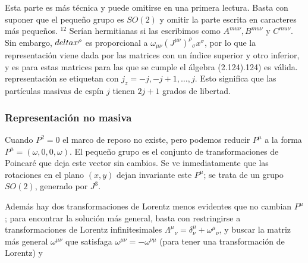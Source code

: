 {Esta parte es más técnica y puede omitirse en una primera lectura. Basta con suponer que el pequeño grupo es $S O(2)$ y omitir la parte escrita en caracteres más pequeños. ${ }^{12}$ Serían hermitianas si las escribimos como $A^{mu \nu}, B^{mu \nu}$ y $C^{mu \nu}$. Sin embargo, $\\delta x^{\rho}$ es proporcional a $\omega_{\mu \nu}\left(J^{\mu \nu}\right)^{\rho}{ }_{\sigma} x^{\sigma}$, por lo que la representación viene dada por las matrices con un índice superior y otro inferior, y es para estas matrices para las que se cumple el álgebra (2.124).124) es válida. representación se etiquetan con $j_{z}=-j,-j+1, \ldots, j$. Esto significa que las partículas masivas de espín $j$ tienen $2 j+1$ grados de libertad.
  \subsubsection{Representación no masiva}
  
  Cuando $P^{2}=0$ el marco de reposo no existe, pero podemos reducir $P^{\mu}$ a la forma $P^{\mu}=(\omega, 0,0, \omega)$. El pequeño grupo es el conjunto de transformaciones de Poincaré que deja este vector sin cambios. Se ve inmediatamente que las rotaciones en el plano $(x, y)$ dejan invariante este $P^{\mu}$; se trata de un grupo $S O(2)$, generado por $J^{3}$.

  Además hay dos transformaciones de Lorentz menos evidentes que no cambian $P^{\mu}$; para encontrar la solución más general, basta con restringirse a transformaciones de Lorentz infinitesimales $\Lambda^{\mu}{ }_{\nu}=\delta_{\nu}^{\mu}+\omega^{\mu}{ }_{\nu}$, y buscar la matriz más general $\omega^{\mu \nu}$ que satisfaga $\omega^{\mu \nu}=-\omega^{\nu \mu}$ (para tener una transformación de Lorentz) y

}
